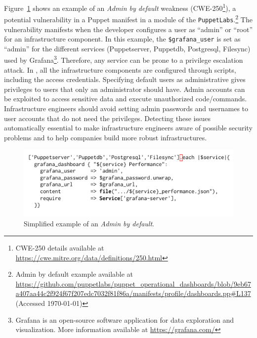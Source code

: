 %
Figure~\ref{lst:manifest-example} shows an example of an
\textit{Admin by default} weakness (CWE-250\footnote{CWE-250 details
available at \url{https://cwe.mitre.org/data/definitions/250.html}}),
a potential vulnerability in a Puppet manifest in a module of the
\texttt{PuppetLabs}.\footnote{Admin by default example available at 
\url{https://github.com/puppetlabs/puppet\_operational\_dashboards/blob/9eb67a407aa44c2f924f67f207edc7032f81f86a/manifests/profile/dashboards.pp\#L137} (Accessed \today)}
The vulnerability manifests when the developer
configures a user as ``admin'' or ``root'' for an
infrastructure component. In this example, the \texttt{\$grafana\_user}
is set as ``admin'' for the different services (Puppetserver, Puppetdb, Postgresql, Filesync) used by Grafana\footnote{Grafana is an open-source software
application for data exploration and visualization.
More information available at \url{https://grafana.com/}}. Therefore, 
any service can be prone to a privilege escalation attack.
In \iac{}, all the infrastructure components
are configured through scripts, including the access credentials.
Specifying default users as administrative gives privileges to users
that only an administrator should have. Admin accounts can be exploited 
to access sensitive data and execute unauthorized
code/commands. Infrastructure engineers should avoid setting admin
passwords and usernames to user accounts that do not need the privileges.
Detecting these issues automatically essential to 
make infrastructure engineers aware of possible security problems and
to help companies build more robust infrastructures.


\begin{figure}[t!]
  \centering
  \includegraphics[width=\linewidth]{Figures/Figure-1.pdf}
  \caption{Simplified example of an \textit{Admin by default}.}\label{lst:manifest-example}
  \vspace{-3ex}
\end{figure}


